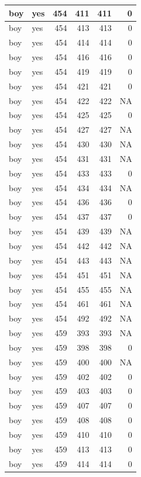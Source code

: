 \documentclass[man]{apa6}
\begin{document}
\begin{tabular}{l|l|r|r|r|r}
\hline
boy & yes & 454 & 411 & 411 & 0\\
\hline
boy & yes & 454 & 413 & 413 & 0\\
\hline
boy & yes & 454 & 414 & 414 & 0\\
\hline
boy & yes & 454 & 416 & 416 & 0\\
\hline
boy & yes & 454 & 419 & 419 & 0\\
\hline
boy & yes & 454 & 421 & 421 & 0\\
\hline
boy & yes & 454 & 422 & 422 & NA\\
\hline
boy & yes & 454 & 425 & 425 & 0\\
\hline
boy & yes & 454 & 427 & 427 & NA\\
\hline
boy & yes & 454 & 430 & 430 & NA\\
\hline
boy & yes & 454 & 431 & 431 & NA\\
\hline
boy & yes & 454 & 433 & 433 & 0\\
\hline
boy & yes & 454 & 434 & 434 & NA\\
\hline
boy & yes & 454 & 436 & 436 & 0\\
\hline
boy & yes & 454 & 437 & 437 & 0\\
\hline
boy & yes & 454 & 439 & 439 & NA\\
\hline
boy & yes & 454 & 442 & 442 & NA\\
\hline
boy & yes & 454 & 443 & 443 & NA\\
\hline
boy & yes & 454 & 451 & 451 & NA\\
\hline
boy & yes & 454 & 455 & 455 & NA\\
\hline
boy & yes & 454 & 461 & 461 & NA\\
\hline
boy & yes & 454 & 492 & 492 & NA\\
\hline
boy & yes & 459 & 393 & 393 & NA\\
\hline
boy & yes & 459 & 398 & 398 & 0\\
\hline
boy & yes & 459 & 400 & 400 & NA\\
\hline
boy & yes & 459 & 402 & 402 & 0\\
\hline
boy & yes & 459 & 403 & 403 & 0\\
\hline
boy & yes & 459 & 407 & 407 & 0\\
\hline
boy & yes & 459 & 408 & 408 & 0\\
\hline
boy & yes & 459 & 410 & 410 & 0\\
\hline
boy & yes & 459 & 413 & 413 & 0\\
\hline
boy & yes & 459 & 414 & 414 & 0\\

\end{tabular}
\end{document}
